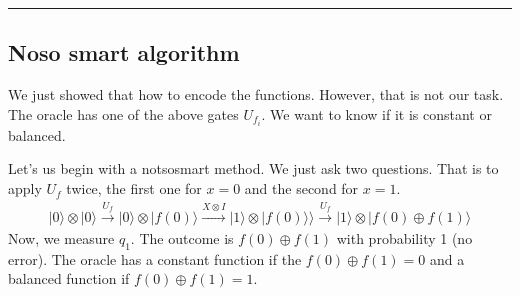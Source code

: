 \documentclass[letterpaper,10pt,english]{jupyterBook}
\begin{document}
\bigskip\hrule\bigskip



\subsection{No\sphinxhyphen{}so smart algorithm}
\label{\detokenize{algorithms/deutsch:no-so-smart-algorithm}}
\sphinxAtStartPar
We just showed that how to encode the functions.  However, that is not our task.  The oracle has one of the above gates \(U_{f_i}\).  We want to know if it is constant or balanced.

\sphinxAtStartPar
Let’s us begin with a not\sphinxhyphen{}so\sphinxhyphen{}smart method.  We just ask two questions.  That is to apply \(U_f\) twice, the first one for \(x=0\) and the second for \(x=1\).
\begin{equation*}
\begin{split}
|0\rangle \otimes |0 \rangle \xrightarrow{U_f} |0\rangle \otimes |f(0)\rangle \xrightarrow{X\otimes I} |1\rangle \otimes |f(0)\rangle  \rangle \xrightarrow{U_f} |1\rangle \otimes |f(0) \oplus f(1)\rangle
\end{split}
\end{equation*}
\sphinxAtStartPar
Now, we measure \(q_1\).  The outcome is \(f(0)\oplus f(1)\) with probability 1 (no error). The oracle has a constant function if the \(f(0)\oplus f(1) = 0\) and a balanced function if  \(f(0)\oplus f(1) = 1\).
\end{document}
